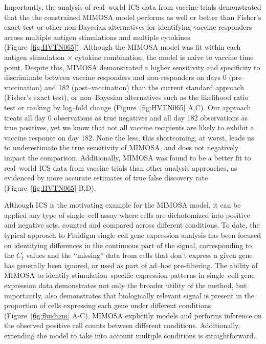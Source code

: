 \documentclass[11pt]{article}
\begin{document}
Importantly, the analysis of real--world ICS data from vaccine trials demonstrated that the the constrained MIMOSA model performs as well or better than Fisher's exact test or other non-Bayesian alternatives for identifying vaccine responders across multiple antigen stimulations and multiple cytokines (Figure~\ref{fig:HVTN065}). Although the MIMOSA model was fit within each antigen stimulation $\times$ cytokine combination, the model is naive to vaccine time point. Despite this, MIMOSA demonstrated a higher sensitivity and specificity to discriminate between vaccine responders and non-responders on days 0 (pre--vaccination) and 182 (post--vaccination) than the current standard approach (Fisher's exact test), or non--Bayesian alternatives such as the likelihood ratio test or ranking by log--fold change (Figure~\ref{fig:HVTN065} A,C). Our approach treats all day 0 observations as true negatives and all day 182 observations as true positives, yet we know that not all vaccine recipients are likely to exhibit a vaccine response on day 182. None the less, this shortcoming, at worst, leads us to underestimate the true sensitivity of MIMOSA, and does not negatively impact the comparison. Additionally, MIMOSA was found to be a better fit to real--world ICS data from vaccine trials than other analysis approaches, as evidenced by more accurate estimates of true false discovery rate (Figure~\ref{fig:HVTN065} B,D).

Although ICS is the motivating example for the MIMOSA model, it can be applied any type of single--cell assay where cells are dichotomized into positive and negative sets, counted and compared across different conditions. To date, the typical approach to Fluidigm single cell gene expression analysis has been focused on identifying differences in the continuous part of the signal, corresponding to the $C_t$ values and the ``missing'' data from cells that don't express a given gene has generally been ignored, or used as part of ad--hoc pre-filtering\cite{Flatz:2011jb}. The ability of MIMOSA to identify stimulation--specific expression patterns in single--cell gene expression data demonstrates not only the broader utility of the method, but importantly, also demonstrates that biologically relevant signal is present in the proportion of cells expressing each gene under different conditions (Figure~\ref{fig:fluidigm} A-C). MIMOSA explicitly models and performs inference on the observed positive cell counts between different conditions. Additionally, extending the model to take into account multiple  conditions is straightforward. 
\end{document}
